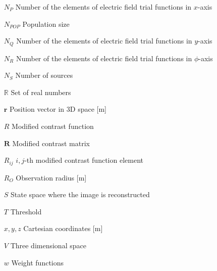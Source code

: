 \begin{itemize}[labelwidth=4em,leftmargin=\dimexpr{}+\relax,align=left]
			\item[$N_P$] Number of the elements of electric field trial functions in $x$-axis
			\item[$N_{POP}$] Population size
			\item[$N_Q$] Number of the elements of electric field trial functions in $y$-axis
			\item[$N_R$] Number of the elements of electric field trial functions in $\phi$-axis
			\item[$N_S$] Number of sources
			\item[$\mathbb{R}$] Set of real numbers
			\item[$\mathbf{r}$] Position vector in 3D space [m]
			\item[$R$] Modified contrast function
			\item[$\mathbf{R}$] Modified contrast matrix
			\item[$R_{ij}$] $i,j$-th modified contrast function element
			\item[$R_O$] Observation radius [m]
			\item[$S$] State space where the image is reconstructed
			\item[$T$] Threshold
			\item[$x, y, z$] Cartesian coordinates [m]
			\item[$V$] Three dimensional space
			\item[$w$] Weight functions
		\end{itemize}
	
		\thispagestyle{empty}
	
	